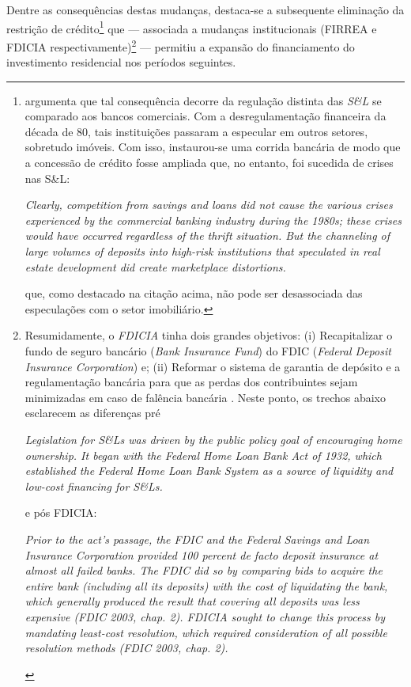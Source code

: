 Dentre as consequências destas mudanças, destaca-se a subsequente eliminação da restrição de crédito\footnote{\textcite{federal_deposit_insurance_corporation_savings_1997} argumenta que tal consequência decorre da regulação distinta das \textit{S\&L} se comparado aos bancos comerciais. Com a desregulamentação financeira da década de 80, tais instituições passaram a especular em outros setores, sobretudo imóveis. Com isso, instaurou-se uma corrida bancária de modo que a concessão de crédito fosse ampliada que, no entanto, foi sucedida de crises nas S\&L:
	
	\begin{citacao}
		\textit{Clearly, competition from savings and loans did not cause the various crises experienced by the commercial banking industry during the 1980s; these crises would have occurred regardless of the thrift situation. But the channeling of large volumes of deposits into high-risk institutions that speculated in real estate development did create marketplace distortions.} \cite[p.~168]{federal_deposit_insurance_corporation_savings_1997}
	\end{citacao}
que, como destacado na citação acima, não pode ser desassociada das especulações com o setor imobiliário.
} que --- associada a mudanças institucionais (FIRREA e FDICIA respectivamente)\footnote{
Resumidamente, o \textit{FDICIA} tinha dois grandes objetivos: (i) Recapitalizar o fundo de seguro bancário (\textit{Bank Insurance Fund}) do FDIC (\textit{Federal Deposit Insurance Corporation}) e; (ii) Reformar o sistema de garantia de depósito e a regulamentação bancária para que as perdas dos contribuintes sejam minimizadas em caso de falência bancária \cite{mishkin_evaluating_1997}.
Neste ponto, os trechos abaixo esclarecem as diferenças pré

\begin{citacao}
	\textit{		Legislation for S\&Ls was driven by the public policy goal of encouraging home ownership. It began with the Federal Home Loan Bank Act of 1932, which established the Federal Home Loan Bank System as a source of liquidity and low-cost financing for S\&Ls.} \cite[p.~170]{federal_deposit_insurance_corporation_savings_1997}
\end{citacao}
e pós FDICIA:

\begin{citacao}
	\textit{Prior to the act’s passage, the FDIC and the Federal Savings and Loan Insurance Corporation provided 100 percent de facto deposit insurance at almost all failed banks. The FDIC did so by comparing bids to acquire the entire bank (including all its deposits) with the cost of liquidating the bank, which generally produced the result that covering all deposits was less expensive (FDIC 2003, chap. 2). FDICIA sought to change this process by mandating least-cost resolution, which required consideration of all possible resolution methods (FDIC 2003, chap. 2).} \cite[p.~iii]{wall_too_2010}
\end{citacao}

}  --- permitiu a expansão do financiamento do investimento residencial nos períodos seguintes.


